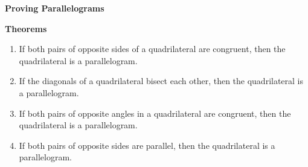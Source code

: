 \begin{center}
\textbf{Proving Parallelograms}
\end{center}

\vspace*{1ex}

\textbf{Theorems} 
\begin{enumerate}[label = \arabic*. ]
\item If both pairs of opposite sides of a quadrilateral are congruent, then the quadrilateral is a parallelogram.
\item If the diagonals of a quadrilateral bisect each other, then the quadrilateral is a parallelogram.
\item If both pairs of opposite angles in a quadrilateral are congruent, then the quadrilateral is a parallelogram.
\item If both pairs of opposite sides are parallel, then the quadrilateral is a parallelogram. 

\end{enumerate}  